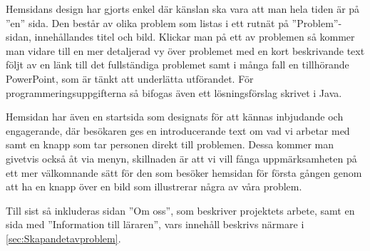 \textcolor{Mahogany}{Hemsidans design har gjorts enkel där känslan ska vara att man hela tiden är på ''en'' sida. Den består av olika problem som listas i ett rutnät på ''Problem''-sidan, innehållandes titel och bild. Klickar man på ett av problemen så kommer man vidare till en mer detaljerad vy över problemet med en kort beskrivande text följt av en länk till det fullständiga problemet samt i många fall en tillhörande PowerPoint, som är tänkt att underlätta utförandet. För programmeringsuppgifterna så bifogas även ett lösningsförslag skrivet i Java.}

\textcolor{Mahogany}{Hemsidan har även en startsida som designats för att kännas inbjudande och engagerande, där besökaren ges en introducerande text om vad vi arbetar med samt en knapp som tar personen direkt till problemen. Dessa kommer man givetvis också åt via menyn, skillnaden är att vi vill fånga uppmärksamheten på ett mer välkomnande sätt för den som besöker hemsidan för första gången genom att ha en knapp över en bild som illustrerar några av våra problem.}

\textcolor{Mahogany}{Till sist så inkluderas sidan ''Om oss'', som beskriver projektets arbete, samt en sida med ''Information till läraren'', vars innehåll beskrivs närmare i \ref{sec:Skapandetavproblem}.}